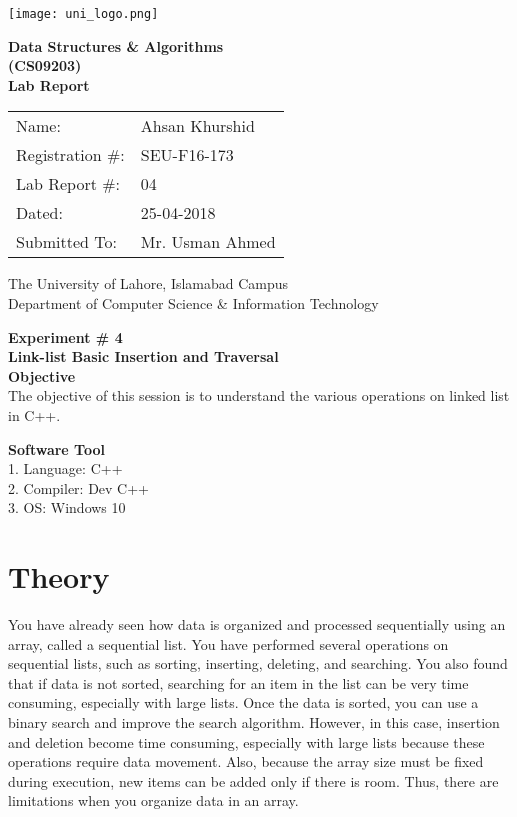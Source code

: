 \documentclass[11pt]{article}            %
\begin{document}
\begin{titlepage}
    \centering
  \vfill
    \texttt{[image: uni\_logo.png]} \\ 
	\vskip2cm
    {\bfseries\Large
	Data Structures \& Algorithms \\ (CS09203)\\
	
	\vskip2cm
	Lab Report 
	 
	\vskip2cm
	}    

\begin{center}
\begin{tabular}{ l l  } 

Name: & Ahsan Khurshid \\ 
Registration \#: & SEU-F16-173 \\ 
Lab Report \#: & 04 \\ 
 Dated:& 25-04-2018\\ 
Submitted To:& Mr. Usman Ahmed\\ 

\end{tabular}
\end{center}
    \vfill
    The University of Lahore, Islamabad Campus\\
Department of Computer Science \& Information Technology
\end{titlepage}


    
    {\bfseries\Large
\centering
	Experiment \# 4 \\

Link-list Basic Insertion and Traversal\\
	
	}    
 \vskip1cm
 \textbf {Objective}\\ The objective of this session is to understand the various operations on linked list in C++.
 
 \textbf {Software Tool} \\
1. Language: C++\\
2. Compiler: Dev C++\\
3. OS: Windows 10\\

\section{Theory }              

You have already seen how data is organized and processed sequentially using an array, called a sequential list. You have performed several operations on sequential lists, such as sorting, inserting, deleting, and searching. You also found that if data is not sorted, searching for an item in the list can be very time consuming, especially with large lists. Once the data is sorted, you can use a binary search and improve the search algorithm. However, in this case, insertion and deletion become time consuming, especially with large lists because these operations require data movement. Also, because the array size must be fixed during execution, new items can be added only if there is room. Thus, there are limitations when you organize data in an array. 
\end{document}
